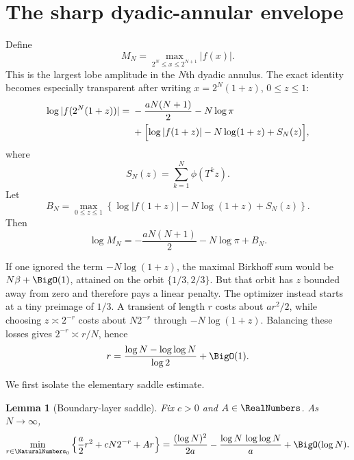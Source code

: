 \documentclass[11pt,oneside]{article}
\newtheorem{lemma}[theorem]{Lemma}
\theoremstyle{definition}
\theoremstyle{remark}
\newcommand{\T}{T}
\begin{document}
\section{The sharp dyadic-annular envelope}
\label{sec:envelope}

Define
\begin{equation}
 M_N=\max_{2^N\le x\le2^{N+1}}|f(x)|.                       \label{eq:MN}
\end{equation}
This is the largest lobe amplitude in the $N$th dyadic annulus.  The exact
identity becomes especially transparent after writing
$x=2^N(1+z)$, $0\le z\le1$:
\begin{equation}
 \begin{split}
 \log|f(2^N(1+z))|
 ={}&-\frac{aN(N+1)}2-N\log\pi\\
 &+\Bigl[\log|f(1+z)|-N\log(1+z)+S_N(z)\Bigr],             \label{eq:annular-exact}
 \end{split}
\end{equation}
where
\begin{equation}
 S_N(z)=\sum_{k=1}^{N}\phi(\T^kz).                         \label{eq:SNplus}
\end{equation}
Let
\begin{equation}
 B_N=\max_{0\le z\le1}
 \left\{\log|f(1+z)|-N\log(1+z)+S_N(z)\right\}.           \label{eq:BN}
\end{equation}
Then
\begin{equation}
 \log M_N=-\frac{aN(N+1)}2-N\log\pi+B_N.                  \label{eq:M-B}
\end{equation}

If one ignored the term $-N\log(1+z)$, the maximal Birkhoff sum would be
$N\beta+\BigO(1)$, attained on the orbit $\{1/3,2/3\}$.  But that orbit has
$z$ bounded away from zero and therefore pays a linear penalty.  The optimizer
instead starts at a tiny preimage of $1/3$.  A transient of length $r$ costs
about $ar^2/2$, while choosing $z\asymp2^{-r}$ costs about $N2^{-r}$ through
$-N\log(1+z)$.  Balancing these losses gives
$2^{-r}\asymp r/N$, hence
\begin{equation}
 r=\frac{\log N-\log\log N}{\log2}+\BigO(1).               \label{eq:r-opt}
\end{equation}

We first isolate the elementary saddle estimate.

\begin{lemma}[Boundary-layer saddle]
Fix $c>0$ and $A\in\RealNumbers$.  As $N\to\infty$,
\begin{equation}
 \min_{r\in\NaturalNumbers_0}
 \left\{\frac a2r^2+cN2^{-r}+Ar\right\}
 =\frac{(\log N)^2}{2a}
  -\frac{\log N\,\log\log N}{a}
  +\BigO(\log N).                                          \label{eq:saddle-lemma}
\end{equation}
\end{lemma}
\end{document}
